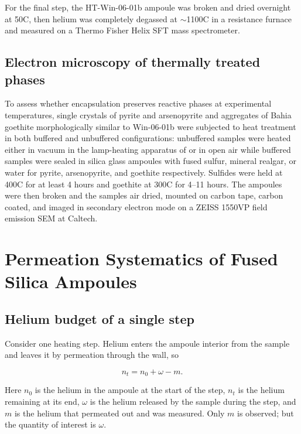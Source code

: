 For the final step, the HT-Win-06-01b ampoule was broken and dried overnight at 50\textdegree C, then helium was completely degassed at $\sim$1100\textdegree C in a resistance furnace and measured on a Thermo Fisher Helix SFT mass spectrometer. 
\subsection{Electron microscopy of thermally treated phases}\label{sec:methods-sem}

To assess whether encapsulation preserves reactive phases at experimental temperatures, single crystals of pyrite and arsenopyrite and aggregates of Bahia goethite morphologically similar to Win-06-01b \citep{shustervasconcelos2005,monteiro2017} were subjected to heat treatment in both buffered and unbuffered configurations: unbuffered samples were heated either in vacuum in the lamp-heating apparatus of \citet{farley1999} or in open air while buffered samples were sealed in silica glass ampoules with fused sulfur, mineral realgar, or water for pyrite, arsenopyrite, and goethite respectively. Sulfides were held at 400\textdegree C for at least 4 hours and goethite at 300\textdegree C for 4--11 hours. The ampoules were then broken and the samples air dried, mounted on carbon tape, carbon coated, and imaged in secondary electron mode on a ZEISS 1550VP field emission SEM at Caltech.

\section{Permeation Systematics of Fused Silica Ampoules}\label{sec:theory}

\subsection{Helium budget of a single step}\label{sec:budget}

Consider one heating step. Helium enters the ampoule interior from the sample and leaves it by permeation through the wall, so

\begin{equation}
\label{eq:permlag}
n_{t} = n_{0} + \omega - m .
\end{equation}

Here $n_{0}$ is the helium in the ampoule at the start of the step, $n_{t}$ is the helium remaining at its end, $\omega$ is the helium released by the sample during the step, and $m$ is the helium that permeated out and was measured. Only $m$ is observed; but the quantity of interest is $\omega$.

